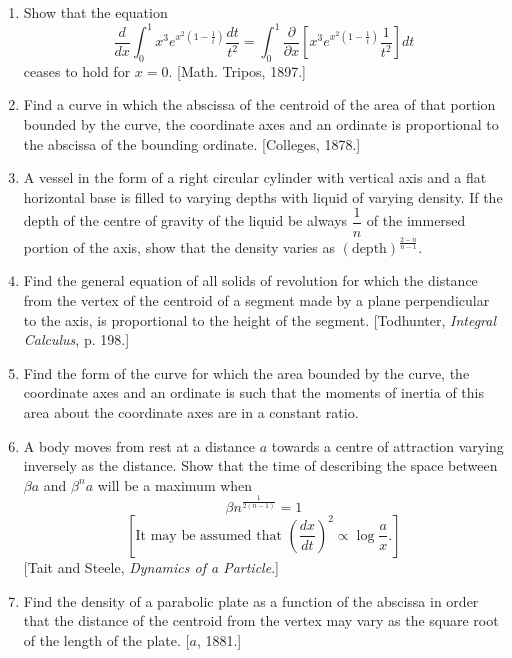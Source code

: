 \documentclass[11pt, a4paper]{article}
\newcommand{\source}[1]{\hfill\textnormal{[#1]}}
\begin{document}
\begin{enumerate}[leftmargin=2em]
Prove that in this case
\[
\frac{du}{da}=\frac{\sin a}{2\sqrt2}\int_0^{\pi/2}\frac{\sin^2\theta\,d\theta}{\left(1-\sin^2\dfrac{a}{2}\sin^2\theta\right)^{3/2}}.
\]
Make any remarks that occur to you as to the reasons for the peculiar form which the general formula assumes in this case. \source{$e$, 1884.}

\item Show that the equation
\[
\frac{d}{dx}\int_0^1 x^3e^{x^2\left(1-\frac1t\right)}\frac{dt}{t^2}=\int_0^1\frac{\partial}{\partial x}\left[x^3e^{x^2\left(1-\frac1t\right)}\frac{1}{t^2}\right]dt
\]
ceases to hold for $x=0$. \source{Math. Tripos, 1897.}

\item Find a curve in which the abscissa of the centroid of the area of that portion bounded by the curve, the coordinate axes and an ordinate is proportional to the abscissa of the bounding ordinate. \source{Colleges, 1878.}

\item A vessel in the form of a right circular cylinder with vertical axis and a flat horizontal base is filled to varying depths with liquid of varying density. If the depth of the centre of gravity of the liquid be always $\dfrac1n$ of the immersed portion of the axis, show that the density varies as $(\text{depth})^{\frac{2-n}{n-1}}$.

\item Find the general equation of all solids of revolution for which the distance from the vertex of the centroid of a segment made by a plane perpendicular to the axis, is proportional to the height of the segment. \source{Todhunter, \textit{Integral Calculus}, p. 198.}

\item Find the form of the curve for which the area bounded by the curve, the coordinate axes and an ordinate is such that the moments of inertia of this area about the coordinate axes are in a constant ratio.

\item A body moves from rest at a distance $a$ towards a centre of attraction varying inversely as the distance. Show that the time of describing the space between $\beta a$ and $\beta^na$ will be a maximum when
\[
\beta n^{\frac{1}{2(n-1)}}=1
\]
\[
\left[\text{It may be assumed that }\left(\frac{dx}{dt}\right)^2\propto\log\frac{a}{x}.\right]
\]
\source{Tait and Steele, \textit{Dynamics of a Particle}.}

\item Find the density of a parabolic plate as a function of the abscissa in order that the distance of the centroid from the vertex may vary as the square root of the length of the plate. \source{$a$, 1881.}


\end{enumerate}
\end{document}
